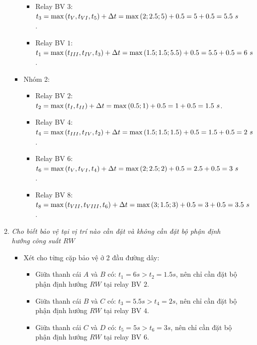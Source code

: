 \documentclass[12pt,a4paper]{article}
\begin{document}
\begin{enumerate}
\begin{enumerate}[\it a.]
\begin{itemize}
\begin{itemize}
								\item Relay BV $3$: $t_3 = \max\left({t_{V}, t_{VI}, t_5}\right) + \Delta t = \max\left({2; 2.5; 5}\right) + 0.5 = 5 + 0.5 = 5.5 ~s$.
								
								\item Relay BV $1$: $t_1 = \max\left({t_{III}, t_{IV}, t_3}\right) + \Delta t = \max\left({1.5; 1.5; 5.5}\right) + 0.5 = 5.5 + 0.5 = 6 ~s$.			
							\end{itemize}
						
						\item Nhóm 2:
							\begin{itemize}
								\item Relay BV $2$: $t_2 = \max\left({t_{I}, t_{II}}\right) + \Delta t = \max\left({0.5; 1}\right) + 0.5 = 1 + 0.5 = 1.5 ~s$.
								
								\item Relay BV $4$: $t_4 = \max\left({t_{III}, t_{IV}, t_2}\right) + \Delta t = \max\left({1.5; 1.5; 1.5}\right) + 0.5 = 1.5 + 0.5 = 2 ~s$.
								
								\item Relay BV $6$: $t_6 = \max\left({t_{V}, t_{VI}, t_4}\right) + \Delta t = \max\left({2; 2.5; 2}\right) + 0.5 = 2.5 + 0.5 = 3 ~s$.
								
								\item Relay BV $8$: $t_8 = \max\left({t_{VII}, t_{VIII}, t_6}\right) + \Delta t = \max\left({3; 1.5; 3}\right) + 0.5 = 3 + 0.5 = 3.5 ~s$.
							\end{itemize}
					\end{itemize}
					
					\item \emph{Cho biết bảo vệ tại vị trí nào cần đặt và không cần đặt bộ phận định hướng công suất $RW$}
						\begin{itemize}
							\item Xét cho từng cặp bảo vệ ở 2 đầu đường dây:
							\begin{itemize}
								\item Giữa thanh cái $A$ và $B$ có: $t_1 = 6 \unit{s} > t_2 = 1.5 \unit{s}$, nên chỉ cần đặt bộ phận định hướng $RW$ tại relay BV $2$.
								
								\item Giữa thanh cái $B$ và $C$ có: $t_3 = 5.5 \unit{s} > t_4 = 2 \unit{s}$, nên chỉ cần đặt bộ phận định hướng $RW$ tại relay BV $4$.
								
								\item Giữa thanh cái $C$ và $D$ có: $t_5 = 5 \unit{s} > t_6 = 3 \unit{s}$, nên chỉ cần đặt bộ phận định hướng $RW$ tại relay BV $6$.
								

\end{itemize}
\end{itemize}
\end{enumerate}
\end{enumerate}
\end{document}
